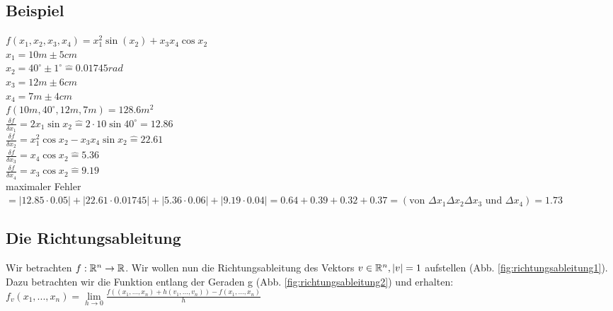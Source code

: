 \subsection{Beispiel}
$ f(x_1,x_2,x_3,x_4) = x_1^2  \sin(x_2) + x_3 x_4  \cos x_2 $\\
$x_1 = 10m \pm 5cm$\\
$x_2=40^\circ \pm 1^\circ \widehat{=} 0.01745 rad$\\
$x_3=12m \pm 6cm$\\
$x_4=7m\pm 4cm$\\
$f(10m,40^\circ,12m,7m) = 128.6m^2$\\
$\frac{\delta f}{\delta x_1} = 2x_1 \sin x_2 \widehat{=} 2 \cdot 10 \sin 40^\circ = 12.86$\\
$\frac{\delta f}{\delta x_2} = x_1^2 \cos x_2 - x_3 x_4 \sin x_2 \widehat{=} 22.61$\\
$\frac{\delta f}{\delta x_3} = x_4 \cos x_2 \widehat{=} 5.36$\\
$\frac{\delta f}{\delta x_4} = x_3 \cos x_2 \widehat{=} 9.19$\\
maximaler Fehler $= |12.85 \cdot 0.05|+|22.61 \cdot 0.01745|+|5.36 \cdot 0.06|+|9.19 \cdot 0.04| = 0.64 + 0.39 + 0.32 + 0.37 = (\textrm{von } \Delta x_1 \Delta x_2 \Delta x_3 \textrm{ und }\Delta x_4) = 1.73 $

\subsection{Die Richtungsableitung}
Wir betrachten $ f: \mathbb{R}^n \rightarrow \mathbb{R}$. Wir wollen nun die Richtungsableitung des Vektors $ v \in \mathbb{R}^n, |v| = 1 $ aufstellen (Abb. \ref{fig:richtungsableitung1}). 
Dazu betrachten wir die Funktion entlang der Geraden g (Abb. \ref{fig:richtungsableitung2}) und erhalten: $ f_v(x_1,...,x_n) = \lim\limits_{h\rightarrow 0} \frac{f((x_1,...,x_n)+h(v_1,...,v_n)) - f(x_1,...,x_n)}{h} $



